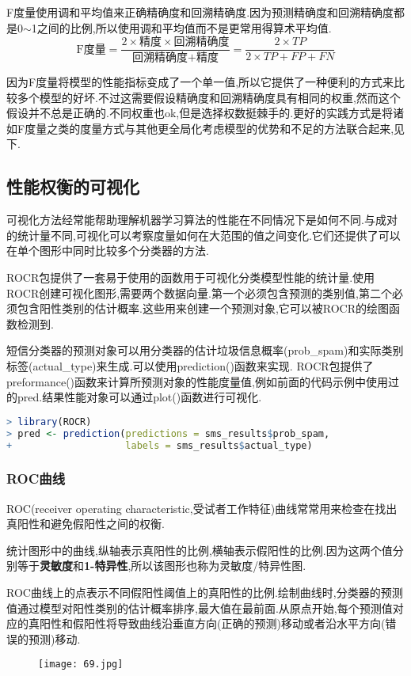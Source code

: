 \documentclass[11pt,a4paper,oneside]{book}
\begin{document}
F度量使用调和平均值来正确精确度和回溯精确度.因为预测精确度和回溯精确度都是0$ \sim $1之间的比例,所以使用调和平均值而不是更常用得算术平均值.
\begin{equation}
	\mbox{F度量}=\frac{2\times\mbox{精度}\times\mbox{回溯精确度}}{\mbox{回溯精确度}+\mbox{精度}}=\frac{2\times TP}{2\times TP +FP+FN}
\end{equation}

因为F度量将模型的性能指标变成了一个单一值,所以它提供了一种便利的方式来比较多个模型的好坏.不过这需要假设精确度和回溯精确度具有相同的权重,然而这个假设并不总是正确的.不同权重也ok,但是选择权数挺棘手的.更好的实践方式是将诸如F度量之类的度量方式与其他更全局化考虑模型的优势和不足的方法联合起来,见下.

\subsection{性能权衡的可视化}
可视化方法经常能帮助理解机器学习算法的性能在不同情况下是如何不同.与成对的统计量不同,可视化可以考察度量如何在大范围的值之间变化.它们还提供了可以在单个图形中同时比较多个分类器的方法.

ROCR包提供了一套易于使用的函数用于可视化分类模型性能的统计量.使用ROCR创建可视化图形,需要两个数据向量.第一个必须包含预测的类别值,第二个必须包含阳性类别的估计概率.这些用来创建一个预测对象,它可以被ROCR的绘图函数检测到.

短信分类器的预测对象可以用分类器的估计垃圾信息概率(prob\_spam)和实际类别标签(actual\_type)来生成.可以使用prediction()函数来实现. ROCR包提供了preformance()函数来计算所预测对象的性能度量值,例如前面的代码示例中使用过的pred.结果性能对象可以通过plot()函数进行可视化.

\begin{lstlisting}[language=r]
> library(ROCR)
> pred <- prediction(predictions = sms_results$prob_spam,
+                    labels = sms_results$actual_type)
\end{lstlisting}

\subsubsection{ROC曲线}
ROC(receiver operating characteristic,受试者工作特征)曲线常常用来检查在找出真阳性和避免假阳性之间的权衡.

统计图形中的曲线,纵轴表示真阳性的比例,横轴表示假阳性的比例.因为这两个值分别等于\textbf{灵敏度}和\textbf{1-特异性},所以该图形也称为灵敏度/特异性图.

ROC曲线上的点表示不同假阳性阈值上的真阳性的比例.绘制曲线时,分类器的预测值通过模型对阳性类别的估计概率排序,最大值在最前面.从原点开始,每个预测值对应的真阳性和假阳性将导致曲线沿垂直方向(正确的预测)移动或者沿水平方向(错误的预测)移动.
\begin{figure}[H]
	\centering
	\texttt{[image: 69.jpg]}
\end{figure}
\end{document}
